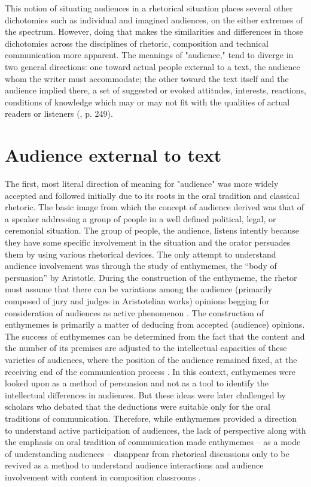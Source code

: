 This notion of situating audiences in a rhetorical situation places several other dichotomies such as individual and imagined audiences, on the either extremes of the spectrum. However, doing that makes the similarities and differences in those dichotomies across the disciplines of rhetoric, composition and technical communication more apparent. The meanings of "audience," tend to diverge in two general directions: one toward actual people external to a text, the audience whom the writer must accommodate; the other toward the text itself and the audience implied there, a set of suggested or evoked attitudes, interests, reactions, conditions of knowledge which may or may not fit with the qualities of actual readers or listeners (\cite{park1982meanings}, p. 249).

\section{Audience external to text}
The first, most literal direction of meaning for "audience" was more widely accepted and followed initially due to its roots in the oral tradition and classical rhetoric. The basic image from which the concept of audience derived was that of a speaker addressing a group of people in a well defined political, legal, or ceremonial situation. The group of people, the audience, listens intently because they have some specific involvement in the situation and the orator persuades them by using various rhetorical devices. The only attempt to understand audience involvement was through the study of enthymemes, the “body of persuasion” by Aristotle. During the construction of the enthymeme, the rhetor must assume that there can be variations among the audience (primarily composed of jury and judges in Aristotelian works) opinions begging for consideration of audiences as active phenomenon \cite{emmel1994toward}. The construction of enthymemes is primarily a matter of deducing from accepted (audience) opinions. The success of enthymemes can be determined from the fact that the content and the number of its premises are adjusted to the intellectual capacities of these varieties of audiences, where the position of the audience remained fixed, at the receiving end of the communication process \cite{emmel1994toward}. In this context, enthymemes were looked upon as a method of persuasion and not as a tool to identify the intellectual differences in audiences. But these ideas were later challenged by scholars who debated that the deductions were suitable only for the oral traditions of communication. Therefore, while enthymemes provided a direction to understand active participation of audiences, the lack of perspective along with the emphasis on oral tradition of communication made enthymemes – as a mode of understanding audiences – disappear from rhetorical discussions only to be revived as a method to understand audience interactions and audience involvement with content in composition classrooms \cite{seas2006enthymematic, emmel1994toward}.


